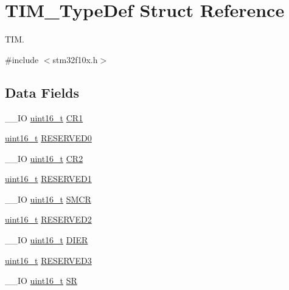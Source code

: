 \hypertarget{struct_t_i_m___type_def}{\section{T\-I\-M\-\_\-\-Type\-Def Struct Reference}
\label{struct_t_i_m___type_def}
}


T\-I\-M.  




{\ttfamily \#include $<$stm32f10x.\-h$>$}

\subsection*{Data Fields}
\begin{DoxyCompactItemize}
\item 
\-\_\-\-\_\-\-I\-O \hyperlink{stdint_8h_a273cf69d639a59973b6019625df33e30}{uint16\-\_\-t} \hyperlink{struct_t_i_m___type_def_a410988826004fdd21d55071215144ba9}{C\-R1}
\item 
\hyperlink{stdint_8h_a273cf69d639a59973b6019625df33e30}{uint16\-\_\-t} \hyperlink{struct_t_i_m___type_def_a88caad1e82960cc6df99d935ece26c1b}{R\-E\-S\-E\-R\-V\-E\-D0}
\item 
\-\_\-\-\_\-\-I\-O \hyperlink{stdint_8h_a273cf69d639a59973b6019625df33e30}{uint16\-\_\-t} \hyperlink{struct_t_i_m___type_def_a954eb69fd4e2e6b43ba6c80986f691d8}{C\-R2}
\item 
\hyperlink{stdint_8h_a273cf69d639a59973b6019625df33e30}{uint16\-\_\-t} \hyperlink{struct_t_i_m___type_def_a59c46ac3a56c6966a7f8f379a2fd1e3e}{R\-E\-S\-E\-R\-V\-E\-D1}
\item 
\-\_\-\-\_\-\-I\-O \hyperlink{stdint_8h_a273cf69d639a59973b6019625df33e30}{uint16\-\_\-t} \hyperlink{struct_t_i_m___type_def_a476012f1b4567ffc21ded0b5fd50985e}{S\-M\-C\-R}
\item 
\hyperlink{stdint_8h_a273cf69d639a59973b6019625df33e30}{uint16\-\_\-t} \hyperlink{struct_t_i_m___type_def_af62f86f55f2a387518f3de10d916eb7c}{R\-E\-S\-E\-R\-V\-E\-D2}
\item 
\-\_\-\-\_\-\-I\-O \hyperlink{stdint_8h_a273cf69d639a59973b6019625df33e30}{uint16\-\_\-t} \hyperlink{struct_t_i_m___type_def_a25b145e57a694bb384eee08fcd107c3a}{D\-I\-E\-R}
\item 
\hyperlink{stdint_8h_a273cf69d639a59973b6019625df33e30}{uint16\-\_\-t} \hyperlink{struct_t_i_m___type_def_a8f952613a22049f3ea2b50b7e0d10472}{R\-E\-S\-E\-R\-V\-E\-D3}
\item 
\-\_\-\-\_\-\-I\-O \hyperlink{stdint_8h_a273cf69d639a59973b6019625df33e30}{uint16\-\_\-t} \hyperlink{struct_t_i_m___type_def_af686e22c1792dc59dfeffe451d47cf13}{S\-R}

\end{DoxyCompactItemize}
